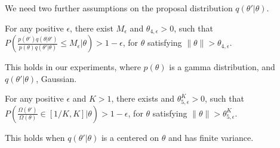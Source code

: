 We need two further assumptions on the proposal distribution $q(\theta'|\theta)$.
\begin{assumption}
For any positive $\epsilon$,  there exist $M_\epsilon$ and $\theta_{4,\epsilon} > 0$,
such that $P(\frac{p(\theta')q(\theta|\theta')}{p(\theta)q(\theta'|\theta)} \le M_\epsilon | \theta) > 1 - \epsilon$,
for $\theta$ satisfying $\| \theta \|  > \theta_{4,\epsilon}$.
  \label{asmp:prior}
\end{assumption}
This holds in our experiments, where $p(\theta)$ is a gamma distribution,
and $q(\theta'|\theta)$, Gaussian.



\begin{assumption}
For any positive $\epsilon$ and  $K > 1$, there exists and $\theta_{5,\epsilon}^K> 0$, such that $P(\frac{\Omega(\theta')}{\Omega(\theta)} \in [1/K, K] | \theta) > 1 - \epsilon$, for $\theta$ satisfying $\| \theta \|  > \theta_{5,\epsilon}^K$.
  \label{asmp:omega}
\end{assumption}
This holds when $q(\theta'|\theta)$ is a centered on $\theta$ and has 
finite variance.

